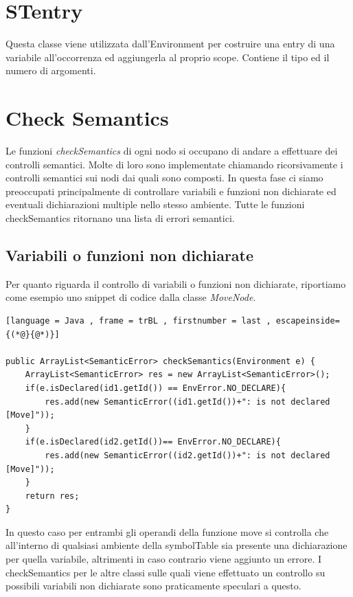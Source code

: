 \documentclass[12pt, a4paper]{report}
\begin{document}
 \section{STentry}
 Questa classe viene utilizzata dall’Environment per costruire una entry di una variabile all’occorrenza ed aggiungerla al proprio scope. Contiene il tipo ed il numero di argomenti.

 \section{Check Semantics}
 Le funzioni \emph{checkSemantics} di ogni nodo si occupano di andare a effettuare dei controlli semantici. Molte di loro sono implementate chiamando ricorsivamente i controlli semantici sui nodi dai quali sono composti. 
 In questa fase ci siamo preoccupati principalmente di controllare variabili e funzioni non dichiarate ed eventuali dichiarazioni multiple nello stesso ambiente. Tutte le funzioni checkSemantics ritornano una lista di errori semantici. 

 \subsection{Variabili o funzioni non dichiarate}
   Per quanto riguarda il controllo di variabili o funzioni non dichiarate, riportiamo come esempio uno snippet di codice dalla classe \emph{MoveNode}.
   \begin{lstlisting}[language = Java , frame = trBL , firstnumber = last , escapeinside={(*@}{@*)}]

public ArrayList<SemanticError> checkSemantics(Environment e) {
    ArrayList<SemanticError> res = new ArrayList<SemanticError>();
    if(e.isDeclared(id1.getId()) == EnvError.NO_DECLARE){
        res.add(new SemanticError((id1.getId())+": is not declared [Move]"));
    }
    if(e.isDeclared(id2.getId())== EnvError.NO_DECLARE){
        res.add(new SemanticError((id2.getId())+": is not declared [Move]"));
    }
    return res;
}
   \end{lstlisting}
   In questo caso per entrambi gli operandi della funzione move si controlla che all'interno di qualsiasi ambiente della symbolTable sia presente una dichiarazione per quella variabile, altrimenti in caso contrario viene aggiunto un errore. I checkSemantics per le altre classi sulle quali viene effettuato un controllo su possibili variabili non dichiarate sono praticamente speculari a questo. 
\end{document}

